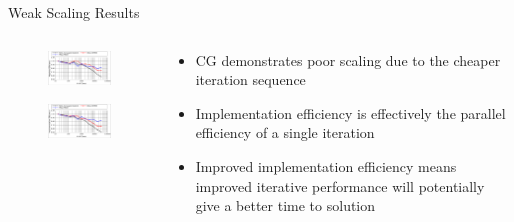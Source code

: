 \documentclass{beamer}
\begin{document}
\begin{frame}{Weak Scaling Results}

  \begin{columns}
    \begin{column}{0.55\textwidth}

      \begin{figure}[htpb!]
        \begin{center}
          \includegraphics[width=2.5in]{titan_weak_absolute.pdf}
        \end{center}
      \end{figure}

      \begin{figure}[htpb!]
        \begin{center}
          \includegraphics[width=2.5in]{titan_weak_implementation.pdf}
        \end{center}
      \end{figure}

    \end{column}

    \begin{column}{0.45\textwidth}

      \begin{itemize}
      \item CG demonstrates poor scaling due to the cheaper iteration
        sequence
        \bigskip
      \item Implementation efficiency is effectively the parallel
        efficiency of a single iteration
        \bigskip
      \item Improved implementation efficiency means improved
        iterative performance will potentially give a better time to
        solution
      \end{itemize}

    \end{column}
  \end{columns}

\end{frame}
\end{document}
